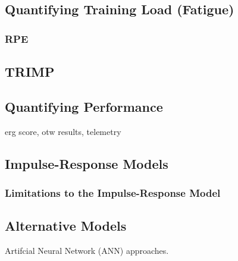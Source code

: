 \subsection{Quantifying Training Load (Fatigue)}
\subsubsection{RPE}
\subsection{TRIMP}


\subsection{Quantifying Performance}
erg score, otw results, telemetry

\subsection{Impulse-Response Models}
\subsubsection{Limitations to the Impulse-Response Model}

\subsection{Alternative Models}
Artifcial Neural Network (ANN) approaches. 
